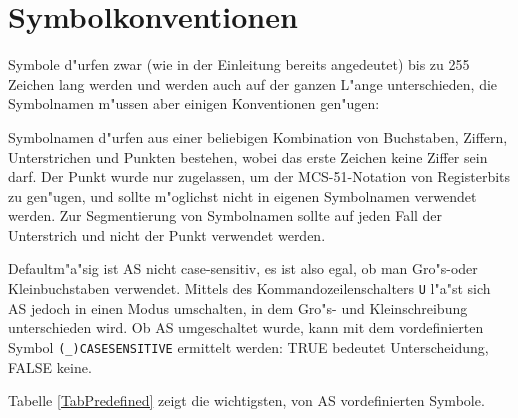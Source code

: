 \documentclass[12pt,a4paper,twoside]{report}
\newcommand{\tty}[1]{{\tt #1}}
\newcommand{\asname}{AS}
\newcommand{\predefsym}[1]{{\tt (\_)#1}}
\begin{document}

\section{Symbolkonventionen}
\label{SectSymConv}

Symbole d"urfen zwar (wie in der Einleitung bereits angedeutet) bis zu
255 Zeichen lang werden und werden auch auf der ganzen L"ange
unterschieden, die Symbolnamen m"ussen aber einigen Konventionen
gen"ugen:
\par
Symbolnamen d"urfen aus einer beliebigen Kombination von Buchstaben,
Ziffern, Unterstrichen und Punkten bestehen, wobei das erste Zeichen
keine Ziffer sein darf.  Der Punkt wurde nur zugelassen, um der
MCS-51-Notation von Registerbits zu gen"ugen, und sollte m"oglichst nicht in
eigenen Symbolnamen verwendet werden.  Zur Segmentierung von Symbolnamen
sollte auf jeden Fall der Unterstrich und nicht der Punkt verwendet werden.
\par
Defaultm"a"sig ist \asname{} nicht case-sensitiv, es ist also egal, ob man
Gro"s-oder Kleinbuchstaben verwendet.  Mittels des Kommandozeilenschalters
\tty{U} l"a"st sich \asname{} jedoch in einen Modus umschalten, in dem Gro"s- und
Kleinschreibung unterschieden wird. Ob \asname{} umgeschaltet wurde, kann mit dem
vordefinierten Symbol \predefsym{CASESENSITIVE} ermittelt werden: TRUE bedeutet
Unterscheidung, FALSE keine.
\par
Tabelle \ref{TabPredefined} zeigt die wichtigsten, von \asname{} vordefinierten
Symbole.
\end{document}
